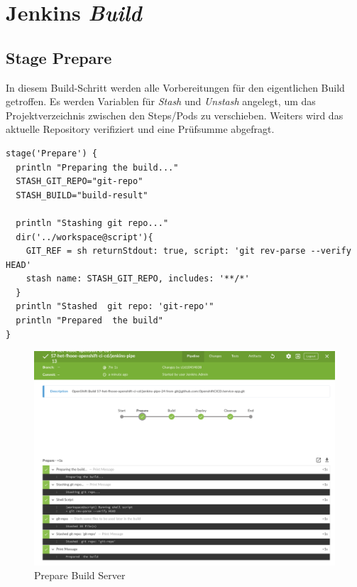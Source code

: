 \section{Jenkins \emph{Build}}
\label{sec:jenkins-build}



\subsection{Stage Prepare}

In diesem Build-Schritt werden alle Vorbereitungen für den eigentlichen Build getroffen. Es werden Variablen für \emph{Stash} und \emph{Unstash} angelegt, um das Projektverzeichnis zwischen den Steps/Pods zu verschieben. Weiters wird das aktuelle Repository verifiziert und eine Prüfsumme abgefragt.

\begin{verbatim}
stage('Prepare') {
  println "Preparing the build..."
  STASH_GIT_REPO="git-repo"
  STASH_BUILD="build-result"

  println "Stashing git repo..."
  dir('../workspace@script'){
    GIT_REF = sh returnStdout: true, script: 'git rev-parse --verify HEAD'
    stash name: STASH_GIT_REPO, includes: '**/*'
  }
  println "Stashed  git repo: 'git-repo'"
  println "Prepared  the build"
}
\end{verbatim}

\begin{figure}[H]
	\centering
	\includegraphics[scale=0.4]{image/jenkins-prepare.png}
	\caption{Prepare Build Server}
	\label{fig:architecture}
\end{figure}

